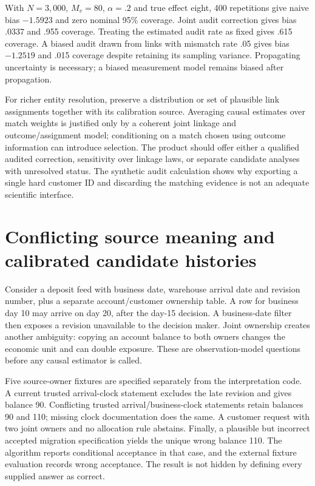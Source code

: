 With $N=3,000$, $M_v=80$, $\alpha=.2$ and true effect eight, 400 repetitions
give naive bias $-1.5923$ and zero nominal 95\% coverage. Joint audit
correction gives bias $.0337$ and .955 coverage. Treating the estimated audit
rate as fixed gives .615 coverage. A biased audit drawn from links with
mismatch rate .05 gives bias $-1.2519$ and .015 coverage despite retaining
its sampling variance. Propagating uncertainty is necessary; a biased
measurement model remains biased after propagation.

For richer entity resolution, preserve a distribution or set of plausible
link assignments together with its calibration source. Averaging causal
estimates over match weights is justified only by a coherent joint linkage
and outcome/assignment model; conditioning on a match chosen using outcome
information can introduce selection. The product should offer either a
qualified audited correction, sensitivity over linkage laws, or separate
candidate analyses with unresolved status. The synthetic audit calculation
shows why exporting a single hard customer ID and discarding the matching
evidence is not an adequate scientific interface.


\section{Conflicting source meaning and calibrated candidate histories}
\label{s6:linked-histories}
Consider a deposit feed with business date, warehouse arrival date and
revision number, plus a separate account/customer ownership table. A row
for business day 10 may arrive on day 20, after the day-15 decision. A
business-date filter then exposes a revision unavailable to the decision
maker. Joint ownership creates another ambiguity: copying an account
balance to both owners changes the economic unit and can double exposure.
These are observation-model questions before any causal estimator is called.

Five source-owner fixtures are specified separately from the interpretation
code. A current trusted arrival-clock statement excludes the late revision
and gives balance 90. Conflicting trusted arrival/business-clock statements
retain balances 90 and 110; missing clock documentation does the same. A
customer request with two joint owners and no allocation rule abstains.
Finally, a plausible but incorrect accepted migration specification yields
the unique wrong balance 110. The algorithm reports conditional acceptance
in that case, and the external fixture evaluation records wrong acceptance.
The result is not hidden by defining every supplied answer as correct.

